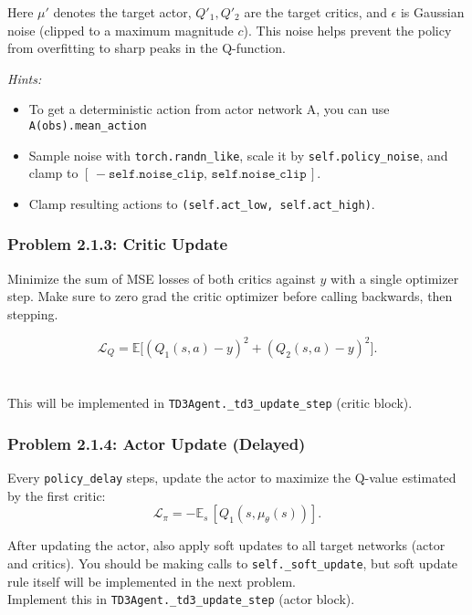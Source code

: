 \documentclass[12pt]{article}
\begin{document}
Here \(\mu'\) denotes the target actor, \(Q'_1, Q'_2\) are the target critics, and \(\epsilon\) is Gaussian noise (clipped to a maximum magnitude \(c\)). This noise helps prevent the policy from overfitting to sharp peaks in the Q-function.

\noindent\textit{Hints:} 
\begin{itemize}
    \item To get a deterministic action from actor network A, you can use \texttt{A(obs).mean_action}
    \item Sample noise with \texttt{torch.randn\_like}, scale it by \texttt{self.policy\_noise}, and clamp to \([\,-\texttt{self.noise\_clip},\,\texttt{self.noise\_clip}\,]\).
    \item Clamp resulting actions to \texttt{(self.act\_low, self.act\_high)}.
\end{itemize}

\subsubsection*{Problem 2.1.3: Critic Update}
Minimize the sum of MSE losses of both critics against \(y\) with a single optimizer step. Make sure to zero grad the critic optimizer before calling backwards, then stepping. 

\begin{equation}
\mathcal{L}_Q = \mathbb{E}\big[(Q_1(s,a)-y)^2 + (Q_2(s,a)-y)^2\big].
\end{equation}
\\
\\ This will be implemented in \texttt{TD3Agent.\_td3\_update\_step} (critic block).

\subsubsection*{Problem 2.1.4: Actor Update (Delayed)}
Every \texttt{policy\_delay} steps, update the actor to maximize the Q-value estimated by the first critic:
\begin{equation}
\textstyle \mathcal{L}_\pi = -\mathbb{E}_s\,[Q_1(s, \mu_\theta(s))].
\end{equation}

After updating the actor, also apply soft updates to all target networks (actor and critics). You should be making calls to \texttt{self.\_soft\_update}, but soft update rule itself will be implemented in the next problem.  \\
Implement this in \texttt{TD3Agent.\_td3\_update\_step} (actor block).
\end{document}
